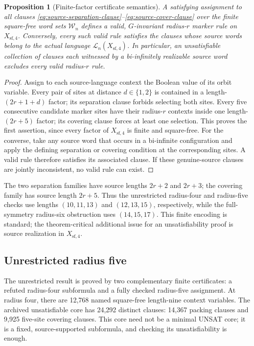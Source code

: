 \documentclass[11pt]{article}
\newtheorem{proposition}[theorem]{Proposition}
\theoremstyle{remark}
\newcommand{\Xsf}{X_{\mathrm{sf},4}}
\newcommand{\Lang}{\mathcal{L}}
\begin{document}
\begin{proposition}[Finite-factor certificate semantics]
\label{prop:finite-clauses}
A satisfying assignment to all clauses
\eqref{eq:source-separation-clause}--\eqref{eq:source-cover-clause}
over the finite square-free word sets $\mathcal W_n$ defines
a valid, $G$-invariant radius-$r$ marker rule on $\Xsf$.
Conversely, every such valid rule satisfies the clauses
whose source words belong to the actual language
$\Lang_n(\Xsf)$. In particular, an unsatisfiable collection
of clauses each witnessed by a bi-infinitely realizable
source word excludes every valid radius-$r$ rule.
\end{proposition}
\begin{proof}
Assign to each source-language context the Boolean value of
its orbit variable. Every pair of sites at distance $d\in\{1,2\}$
is contained in a length-$(2r+1+d)$ factor; its separation
clause forbids selecting both sites. Every five consecutive
candidate marker sites have their radius-$r$ contexts inside
one length-$(2r+5)$ factor; its covering clause forces at
least one selection. This proves the first assertion, since
every factor of $\Xsf$ is finite and square-free. For the
converse, take any source word that occurs in a bi-infinite
configuration and apply the defining separation or covering
condition at the corresponding sites. A valid rule therefore
satisfies its associated clause. If these genuine-source
clauses are jointly inconsistent, no valid rule can exist.
\end{proof}

The two separation families have source lengths
$2r+2$ and $2r+3$; the covering family has source length
$2r+5$. Thus the unrestricted radius-four and radius-five
checks use lengths $(10,11,13)$ and $(12,13,15)$,
respectively, while the full-symmetry radius-six
obstruction uses $(14,15,17)$. This finite encoding
is standard; the theorem-critical additional issue for
an unsatisfiability proof is source realization in $\Xsf$.

\subsection{Unrestricted radius five}

The unrestricted result is proved by two complementary
finite certificates: a refuted radius-four subformula
and a fully checked radius-five assignment. At radius
four, there are 12,768 named square-free length-nine
context variables. The archived unsatisfiable core has
24,292 distinct clauses: 14,367 packing clauses
and 9,925 five-site covering clauses. This core
need not be a minimal UNSAT core; it is a fixed,
source-supported subformula, and checking its
unsatisfiability is enough.
\end{document}
